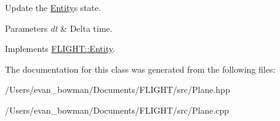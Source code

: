 Update the \hyperlink{class_f_l_i_g_h_t_1_1_entity}{Entity}\textquotesingle{}s state. 


\begin{DoxyParams}{Parameters}
{\em dt} & Delta time. \\
\hline
\end{DoxyParams}


Implements \hyperlink{class_f_l_i_g_h_t_1_1_entity_afb03ab9c3239e0651101cc3103c7c503}{F\+L\+I\+G\+H\+T\+::\+Entity}.



The documentation for this class was generated from the following files\+:\begin{DoxyCompactItemize}
\item 
/\+Users/evan\+\_\+bowman/\+Documents/\+F\+L\+I\+G\+H\+T/src/Plane.\+hpp\item 
/\+Users/evan\+\_\+bowman/\+Documents/\+F\+L\+I\+G\+H\+T/src/Plane.\+cpp\end{DoxyCompactItemize}
